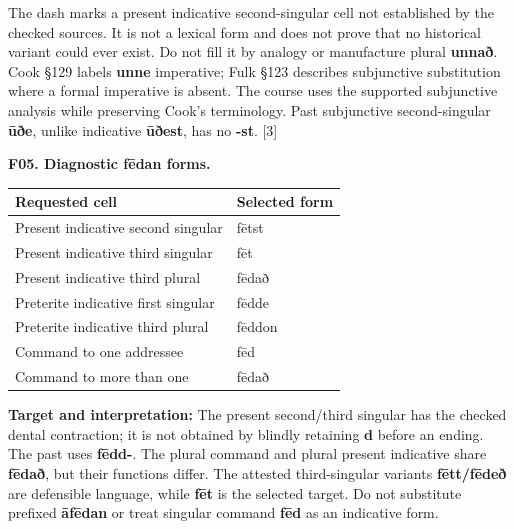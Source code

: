 The dash marks a present indicative second-singular cell not established by the checked sources. It is not a lexical form and does not prove that no historical variant could ever exist. Do not fill it by analogy or manufacture plural \textbf{unnað}. Cook §129 labels \textbf{unne} imperative; Fulk §123 describes subjunctive substitution where a formal imperative is absent. The course uses the supported subjunctive analysis while preserving Cook's terminology. Past subjunctive second-singular \textbf{ūðe}, unlike indicative \textbf{ūðest}, has no \textbf{-st}. [3]

\par\begin{minipage}{\linewidth}\raggedright
\textbf{F05. Diagnostic fēdan forms.}

\par\begingroup
\fontsize{10.5}{13.2}\selectfont
\setlength{\LTleft}{0pt}\setlength{\LTright}{\fill}
\noindent
\begin{tabular}{@{}>{\raggedright\arraybackslash}p{81.75mm}>{\raggedright\arraybackslash}p{39.43mm}@{}}
\toprule
\textbf{Requested cell} & \textbf{Selected form} \\
\midrule
Present indicative second singular & fētst \\
Present indicative third singular & fēt \\
Present indicative third plural & fēdað \\
Preterite indicative first singular & fēdde \\
Preterite indicative third plural & fēddon \\
Command to one addressee & fēd \\
Command to more than one & fēdað \\
\bottomrule
\end{tabular}
\par\endgroup

\textbf{Target and interpretation:} The present second/\allowbreak{}third singular has the checked dental contraction; it is not obtained by blindly retaining \textbf{d} before an ending. The past uses \textbf{fēdd-}. The plural command and plural present indicative share \textbf{fēdað}, but their functions differ. The attested third-singular variants \textbf{fētt/\allowbreak{}fēdeð} are defensible language, while \textbf{fēt} is the selected target. Do not substitute prefixed \textbf{āfēdan} or treat singular command \textbf{fēd} as an indicative form.

\end{minipage}\par\addvspace{4pt}

